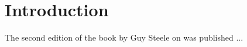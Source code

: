 \chapter{Introduction}
\setcounter{page}{1}%
%
\label{chap-introduction}%

The second edition of the book by Guy Steele on \commonlisp{}
\cite{Steele:1990:CLL:95411} was published ...

